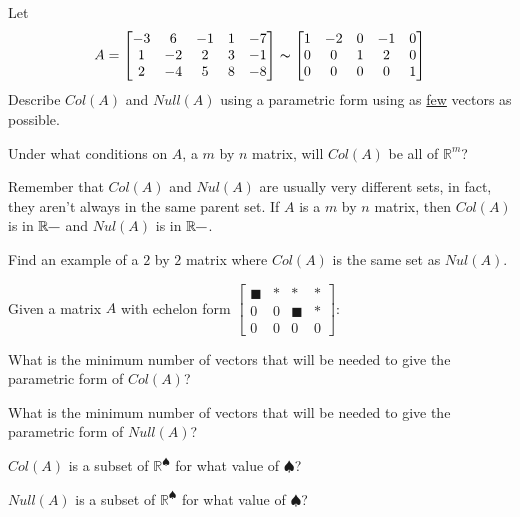 \bq Let $$A=\begin{bmatrix} -3&6&-1&1&-7 \\1&-2&2&3&-1 \\2&-4&5&8&-8 \end{bmatrix} \thicksim \begin{bmatrix} 1&-2&0&-1&0\\0&0&1&2&0 \\ 0&0&0&0&1 \end{bmatrix}$$
Describe $Col(A)$ and $Null(A)$ using a parametric form using as \underline{few} vectors as possible.
\eq

\bq Under what conditions on $A$, a $m$ by $n$ matrix, will $Col(A)$ be all of $\mathbb{R}^m$?
\eq

Remember that $Col(A)$ and $Nul(A)$ are usually very different sets, in fact, they aren't always in the same parent set. If $A$ is a $m$ by $n$ matrix, then $Col(A)$ is in $\mathbb{R}^{\underline{\hspace{.10in}}}$ and $Nul(A)$ is in $\mathbb{R}^{\underline{\hspace{.10in}}}$.

\bq Find an example of a $2$ by $2$ matrix where $Col(A)$ is the same set as $Nul(A)$.
\eq

\bq Given a matrix $A$ with echelon form $\begin{bmatrix} \blacksquare&*&*&*\\0&0&\blacksquare&* \\ 0&0&0&0 \end{bmatrix}$:
\be
\item What is the minimum number of vectors that will be needed to give the parametric form of $Col(A)$?
\item What is the minimum number of vectors that will be needed to give the parametric form of $Null(A)$?
\item $Col(A)$ is a subset of $\mathbb{R}^\spadesuit$ for what value of $\spadesuit$?
\item $Null(A)$ is a subset of $\mathbb{R}^\spadesuit$ for what value of $\spadesuit$?
\ee
\eq

